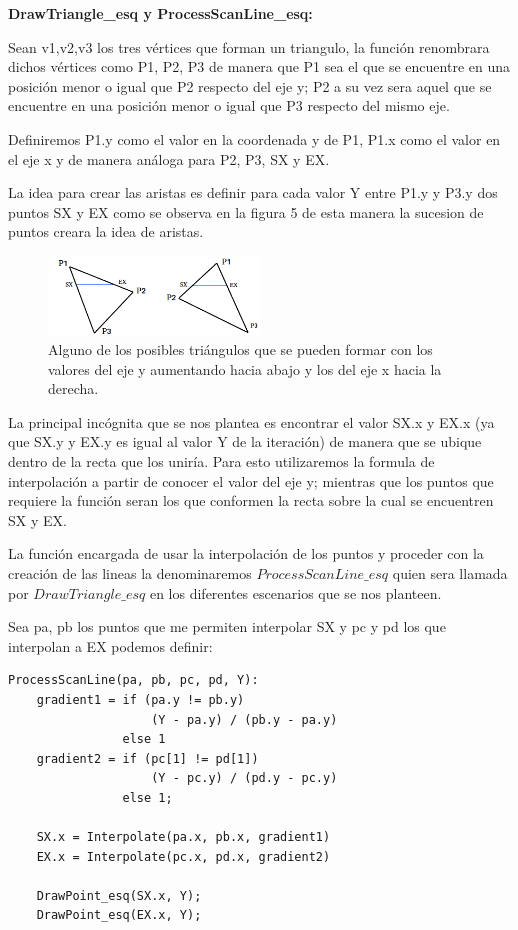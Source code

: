 \documentclass[a4paper]{article}
\begin{document}
\textbf{DrawTriangle\_esq y ProcessScanLine\_esq:}

\par  Sean v1,v2,v3 los tres vértices que forman un triangulo, la función renombrara dichos vértices como P1, P2, P3 de manera que P1 sea el que se encuentre en una posición menor o igual que P2 respecto del eje y;  P2 a su vez sera aquel que se encuentre en una posición menor o igual que P3 respecto del mismo eje. 
\par Definiremos P1.y como el valor en la coordenada y de P1, P1.x como el valor en el eje x y de manera análoga para P2, P3, SX y EX. 
\par La idea para crear las aristas es definir para cada valor Y entre P1.y y P3.y dos puntos SX y EX como se observa en la figura 5 de esta manera la sucesion de puntos creara la idea de aristas.


\begin{figure}[h]
    \centering
    \includegraphics[width=0.50\textwidth]{Imagenes/e.png}
    \caption{Alguno de los posibles triángulos que se pueden formar con los valores del eje y aumentando hacia abajo y los del eje x hacia la derecha.}
    \label{fig:mesh1}
\end{figure}

\par La principal incógnita que se nos plantea es encontrar el valor SX.x y EX.x (ya que SX.y y EX.y es igual al valor Y de la iteración) de manera que se ubique dentro de la recta que los uniría. Para esto utilizaremos la formula de interpolación a partir de conocer el valor del eje y; mientras que los puntos que requiere la función seran los que conformen la recta sobre la cual se encuentren SX y EX.
\par La función encargada de usar la interpolación de los puntos y proceder con la creación de las lineas la denominaremos $ProcessScanLine\_esq$ quien sera llamada por $DrawTriangle\_esq$ en los diferentes escenarios que se nos planteen.


Sea pa, pb los puntos que me permiten interpolar SX y pc y pd los que interpolan a EX podemos definir: 


\begin{verbatim}
ProcessScanLine(pa, pb, pc, pd, Y):
    gradient1 = if (pa.y != pb.y) 
                    (Y - pa.y) / (pb.y - pa.y)
                else 1                          
    gradient2 = if (pc[1] != pd[1]) 
                    (Y - pc.y) / (pd.y - pc.y)
                else 1;
            
    SX.x = Interpolate(pa.x, pb.x, gradient1)
    EX.x = Interpolate(pc.x, pd.x, gradient2)
    
    DrawPoint_esq(SX.x, Y);
    DrawPoint_esq(EX.x, Y);
\end{verbatim}
\end{document}
